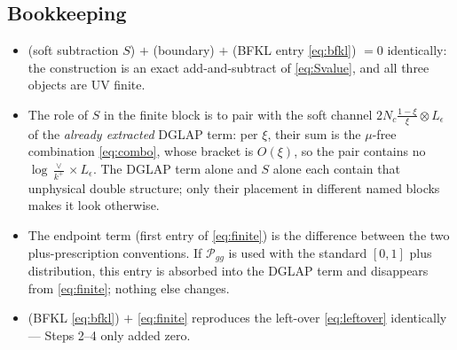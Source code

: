 \documentclass[10pt]{article}
\newcommand{\Leps}{L_{\epsilon}}
\begin{document}
\subsection*{Bookkeeping}
\begin{itemize}
\item[(i)] (soft subtraction $S$) $+$ (boundary) $+$ (BFKL entry \eqref{eq:bfkl}) $=0$
identically: the construction is an exact add-and-subtract of \eqref{eq:Svalue}, and all three
objects are UV finite.
\item[(ii)] The role of $S$ in the finite block is to pair with the soft channel
$2N_{c}\frac{1-\xi}{\xi}\otimes\Leps$ of the \emph{already extracted} DGLAP term: per $\xi$,
their sum is the $\mu$-free combination \eqref{eq:combo}, whose bracket is $O(\xi)$, so the
pair contains no $\log\frac{\vee}{k^{+}}\times\Leps$. The DGLAP term alone and $S$ alone each
contain that unphysical double structure; only their placement in different named blocks makes
it look otherwise.
\item[(iii)] The endpoint term (first entry of \eqref{eq:finite}) is the difference between the
two plus-prescription conventions. If $\mathcal P_{gg}$ is used with the standard $[0,1]$ plus
distribution, this entry is absorbed into the DGLAP term and disappears from
\eqref{eq:finite}; nothing else changes.
\item[(iv)] (BFKL \eqref{eq:bfkl}) $+$ \eqref{eq:finite} reproduces the left-over
\eqref{eq:leftover} identically --- Steps 2--4 only added zero.
\end{itemize}
\end{document}
